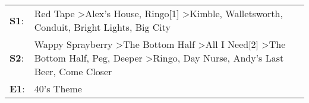 \begin{supertabular}{p{0.03\textwidth}p{0.92\textwidth}}
 \textbf{S1}:  &                                                                                                                                                  Red Tape\textsuperscript{} \textgreater \enspace Alex's House\textsuperscript{}, \enspace Ringo[1]\textsuperscript{} \textgreater \enspace Kimble\textsuperscript{}, \enspace Walletsworth\textsuperscript{}, \enspace Conduit\textsuperscript{}, \enspace Bright Lights, Big City\textsuperscript{}  \enspace  \\
 \textbf{S2}:  &  Wappy Sprayberry\textsuperscript{} \textgreater \enspace The Bottom Half\textsuperscript{} \textgreater \enspace All I Need[2]\textsuperscript{} \textgreater \enspace The Bottom Half\textsuperscript{}, \enspace Peg\textsuperscript{}, \enspace Deeper\textsuperscript{} \textgreater \enspace Ringo\textsuperscript{}, \enspace Day Nurse\textsuperscript{}, \enspace Andy's Last Beer\textsuperscript{}, \enspace Come Closer\textsuperscript{}  \enspace  \\
 \textbf{E1}:  &                                                                                                                                                                                                                                                                                                                                                                                                                          40's Theme\textsuperscript{}  \enspace  \\
\end{supertabular}
